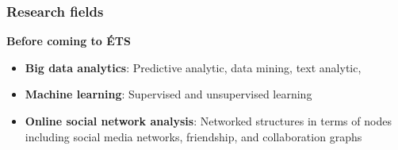 \documentclass{beamer}
\begin{document}
\begin{frame}[fragile] %
\frametitle{Research fields}

\textbf{Before coming to \'ETS}

\begin{itemize}
	\item \textbf{Big data analytics}: Predictive analytic, data mining, text analytic, 
	\item \textbf{Machine learning}: Supervised and unsupervised learning
	\item \textbf{Online social network analysis}: Networked structures in terms of nodes including social media networks, friendship, and collaboration graphs
\end{itemize}







\end{frame}
\end{document}
